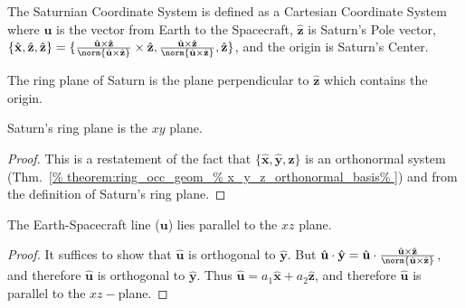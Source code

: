\documentclass[crop=false,class=article,oneside]{standalone}
\begin{document}
        \begin{definition}
            The Saturnian Coordinate System is defined as a
            Cartesian Coordinate System where $\mathbf{u}$
            is the vector from Earth to the Spacecraft,
            $\hat{\mathbf{z}}$ is Saturn's Pole vector, $\{\hat{\mathbf{x}},%
                  \hat{\mathbf{z}},%
                  \hat{\mathbf{z}}\}%
             =\{\frac{\hat{\mathbf{u}}\times\hat{\mathbf{z}}}%
                 {%
                     \norm{\hat{\mathbf{u}}\times\hat{\mathbf{z}}}%
                 }
                \times\hat{\mathbf{z}},%
              \frac{\hat{\mathbf{u}}\times\hat{\mathbf{z}}}%
                   {\norm{\hat{\mathbf{u}}\times\hat{\mathbf{z}}}},%
                   \hat{\mathbf{z}}\}$,
            and the origin is Saturn's Center.
        \end{definition}
        \begin{definition}
            The ring plane of Saturn is the plane perpendicular
            to $\hat{\mathbf{z}}$ which contains the origin.
        \end{definition}
        \begin{theorem}
            Saturn's ring plane is the $xy$ plane.
        \end{theorem}
        \begin{proof}
            This is a restatement of the fact that
            $\{\hat{\mathbf{x}},%
               \hat{\mathbf{y}},%
               \hat{\mathbf{z}}\}$
            is an orthonormal system
            (Thm.~\ref{%
                theorem:ring_occ_geom_%
                x_y_z_orthonormal_basis%
            })
            and from the definition of Saturn's ring plane.
        \end{proof}
        \begin{theorem}
            The Earth-Spacecraft line ($\mathbf{u}$)
            lies parallel to the $xz$ plane.
        \end{theorem}
        \begin{proof}
            It suffices to show that $\hat{\mathbf{u}}$
            is orthogonal to $\hat{\mathbf{y}}$.
            But
            $\hat{\mathbf{u}}\cdot\hat{\mathbf{y}}%
             =\hat{\mathbf{u}}\cdot%
              \frac{\hat{\mathbf{u}}\times \hat{\mathbf{z}}}%
                   {%
                       \norm{\hat{\mathbf{u}}%
                       \times \hat{\mathbf{z}}}%
                   }$,
            and therefore $\hat{\mathbf{u}}$ is orthogonal
            to $\hat{\mathbf{y}}$. Thus
            $\hat{\mathbf{u}}%
             =a_{1}\hat{\mathbf{x}}+a_{2}\hat{\mathbf{z}}$,
            and therefore $\hat{\mathbf{u}}$
            is parallel to the $xz-$plane.
        \end{proof}
\end{document}
